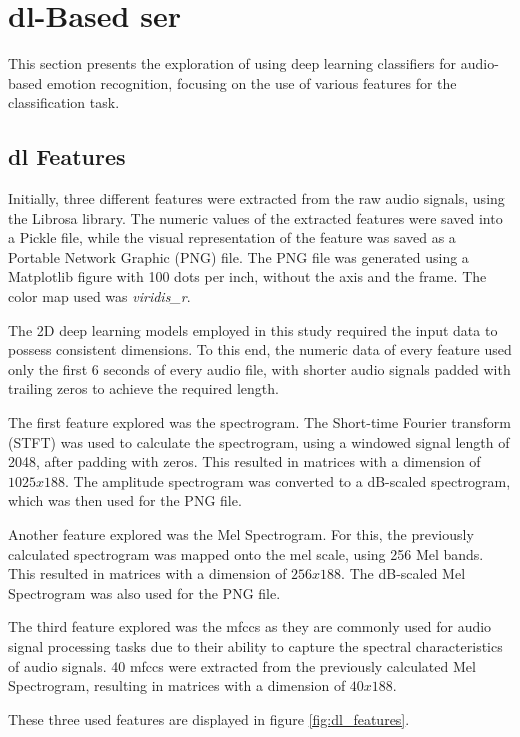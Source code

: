 
\section{\acl{dl}-Based \ac{ser}}

This section presents the exploration of using deep learning classifiers for audio-based emotion recognition, focusing on the use of various features for the classification task.

\subsection{\acl{dl} Features}

Initially, three different features were extracted from the raw audio signals, using the Librosa library. The numeric values of the extracted features were saved into a Pickle file, while the visual representation of the feature was saved as a Portable Network Graphic (PNG) file. The PNG file was generated using a Matplotlib figure with 100 dots per inch, without the axis and the frame. The color map used was \textit{viridis\_r}.

The 2D deep learning models employed in this study required the input data to possess consistent dimensions. To this end, the numeric data of every feature used only the first 6 seconds of every audio file, with shorter audio signals padded with trailing zeros to achieve the required length.

The first feature explored was the spectrogram. The Short-time Fourier transform (STFT) was used to calculate the spectrogram, using a windowed signal length of 2048, after padding with zeros. This resulted in matrices with a dimension of $1025x188$. The amplitude spectrogram was converted to a dB-scaled spectrogram, which was then used for the PNG file.

Another feature explored was the Mel Spectrogram. For this, the previously calculated spectrogram was mapped onto the mel scale, using 256 Mel bands. This resulted in matrices with a dimension of $256x188$. The dB-scaled Mel Spectrogram was also used for the PNG file.

The third feature explored was the \ac{mfccs} as they are commonly used for audio signal processing tasks due to their ability to capture the spectral characteristics of audio signals. 40 \ac{mfccs} were extracted from the previously calculated Mel Spectrogram, resulting in matrices with a dimension of $40x188$.

These three used features are displayed in figure \ref{fig:dl_features}.

